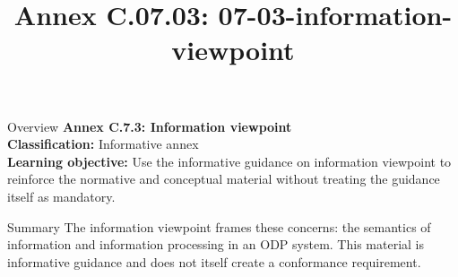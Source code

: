 \documentclass[10pt,letterpaper]{article}
\title{Annex C.07.03: 07-03-information-viewpoint}
\author{}
\date{}
\begin{document}
\maketitle
\begin{CornellOverviewBox}{Overview}
{\Large\bfseries\textcolor{CNavy}{Annex C.7.3: Information viewpoint}}\\[3pt]
{\small\textbf{Classification:} Informative annex}\\
{\small\textbf{Learning objective:} Use the informative guidance on information viewpoint to reinforce the normative and conceptual material without treating the guidance itself as mandatory.}
\end{CornellOverviewBox}
\vspace{3pt}

\begin{CornellNotesTable}
\end{CornellNotesTable}


\begin{CornellSummaryBox}{Summary}
The information viewpoint frames these concerns: the semantics of information and information processing in an ODP system. This material is informative guidance and does not itself create a conformance requirement.
\end{CornellSummaryBox}
\end{document}
